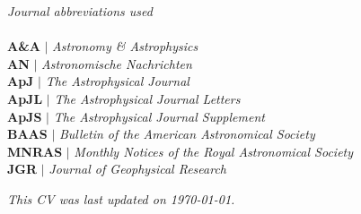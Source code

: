 \documentclass[11pt]{article}
\begin{document}
\noindent \textit{Journal abbreviations used}\\ \\
\textbf{A\&A} $|$ \textit{Astronomy \& Astrophysics}\\
\textbf{AN} $|$ \textit{Astronomische Nachrichten} \\
\textbf{ApJ} $|$ \textit{The Astrophysical Journal}\\
\textbf{ApJL} $|$ \textit{The Astrophysical Journal Letters}\\
\textbf{ApJS} $|$ \textit{The Astrophysical Journal Supplement}\\
\textbf{BAAS} $|$ \textit{Bulletin of the American Astronomical Society}\\
\textbf{MNRAS} $|$ \textit{Monthly Notices of the Royal Astronomical Society}\\
\textbf{JGR} $|$ \textit{Journal of Geophysical Research}\\






\vfill

\begin{center}
\noindent \textit{This CV was last updated on \today.}
\end{center}
\end{document}
